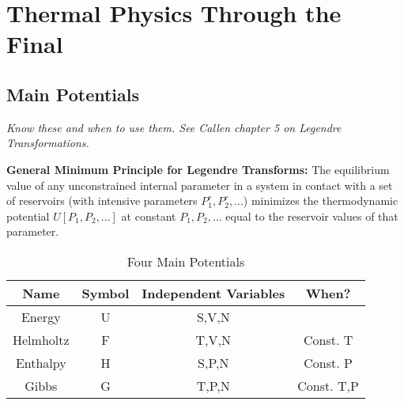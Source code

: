\chapter{Thermal Physics Through the Final}

\section{Main Potentials}

\emph{Know these and when to use them. See Callen chapter 5 on Legendre Transformations.}

\textbf{General Minimum Principle for Legendre Transforms:} The equilibrium value of any unconstrained internal parameter in a system in contact with a set of reservoirs (with intensive parameters $P_1^r,P_2^r,...$) minimizes the thermodynamic potential $U[P_1,P_2,...]$ at constant $P_1,P_2,...$ equal to the reservoir values of that parameter.

\begin{table}[!htbp]
    \caption{Four Main Potentials}
    \centering
        \begin{tabular}{c|c c c}
            \toprule
            Name       & Symbol & Independent Variables  & When? \\
            \midrule
            Energy     & U      & S,V,N                  &  \\
            Helmholtz  & F      & T,V,N                  & Const. T \\
            Enthalpy   & H      & S,P,N                  & Const. P\\
            Gibbs      & G      & T,P,N                  & Const. T,P
    \end{tabular}
    \label{tab:4Potentials}
\end{table}
